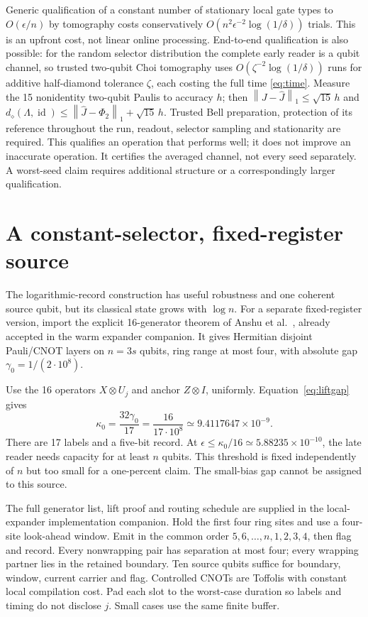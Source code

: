 \documentclass[11pt]{article}
\newcommand{\id}{\operatorname{id}}
\newcommand{\dd}{d_{\diamond}}
\newcommand{\norm}[1]{\left\lVert#1\right\rVert}
\begin{document}
Generic qualification of a constant number of stationary local gate types to
$O(\epsilon/n)$ by tomography costs conservatively
$O(n^2\epsilon^{-2}\log(1/\delta))$ trials. This is an upfront cost, not linear
online processing. End-to-end qualification is also possible: for the random
selector distribution the complete early reader is a qubit channel, so trusted
two-qubit Choi tomography uses $O(\zeta^{-2}\log(1/\delta))$ runs for additive
half-diamond tolerance $\zeta$, each costing the full time \eqref{eq:time}.
Measure the 15 nonidentity two-qubit Paulis to accuracy $h$; then
$\norm{J-\widehat J}_1\le\sqrt{15}\,h$ and
$\dd(\Lambda,\id)\le\norm{\widehat J-\Phi_2}_1+\sqrt{15}\,h$.
Trusted Bell preparation, protection of its reference throughout the run,
readout, selector sampling and stationarity are required. This qualifies an
operation that performs well; it does not improve an inaccurate operation.
It certifies the averaged channel, not every seed separately. A worst-seed
claim requires additional structure or a correspondingly larger qualification.

\section{A constant-selector, fixed-register source}
The logarithmic-record construction has useful robustness and one coherent
source qubit, but its classical state grows with $\log n$. For a separate
fixed-register version, import the explicit 16-generator theorem of Anshu
et al.~\cite{depthone}, already accepted in the warm expander companion. It
gives Hermitian disjoint Pauli/CNOT layers on $n=3s$ qubits, ring range at most
four, with absolute gap $\gamma_0=1/(2\cdot10^8)$.

Use the 16 operators $X\otimes U_j$ and anchor $Z\otimes I$, uniformly.
Equation~\eqref{eq:liftgap} gives
\begin{equation}
 \kappa_0=\frac{32\gamma_0}{17}
 =\frac{16}{17\cdot10^8}\simeq9.4117647\times10^{-9}. \label{eq:tinygap}
\end{equation}
There are 17 labels and a five-bit record. At
$\epsilon\le\kappa_0/16\simeq5.88235\times10^{-10}$, the late reader needs
capacity for at least $n$ qubits. This threshold is fixed independently of $n$ but too small
for a one-percent claim. The small-bias gap cannot be assigned to this source.

The full generator list, lift proof and routing schedule are supplied in the
local-expander implementation companion. Hold the first four ring sites and
use a four-site look-ahead window. Emit in the common order
$5,6,\ldots,n,1,2,3,4$, then flag and record. Every nonwrapping pair has
separation at most four; every wrapping partner lies in the retained boundary.
Ten source qubits suffice for boundary, window, current carrier and flag.
Controlled CNOTs are Toffolis with constant local compilation cost. Pad each
slot to the worst-case duration so labels and timing do not disclose $j$.
Small cases use the same finite buffer.
\end{document}
